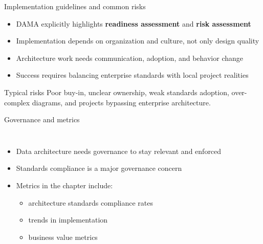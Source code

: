 \documentclass[aspectratio=169,professionalfonts]{beamer}
\newcommand{\sourcefooter}{\vspace{0.4em}{\tiny Source: DAMA-DMBOK2, Chapter 4 (Data Architecture).}}
\begin{document}
\begin{frame}{Implementation guidelines and common risks}
\begin{itemize}
    \item DAMA explicitly highlights \textbf{readiness assessment} and \textbf{risk assessment}
    \item Implementation depends on organization and culture, not only design quality
    \item Architecture work needs communication, adoption, and behavior change
    \item Success requires balancing enterprise standards with local project realities
\end{itemize}

\begin{block}{Typical risks}
Poor buy-in, unclear ownership, weak standards adoption, over-complex diagrams, and projects bypassing enterprise architecture.
\end{block}
\sourcefooter
\end{frame}

\begin{frame}{Governance and metrics}
\begin{columns}[T,totalwidth=\textwidth]
\begin{itemize}
    \item Data architecture needs governance to stay relevant and enforced
    \item Standards compliance is a major governance concern
    \item Metrics in the chapter include:
    \begin{itemize}
        \item architecture standards compliance rates
        \item trends in implementation
        \item business value metrics
    \end{itemize}
\end{itemize}
\centering
{}
\end{columns}
\sourcefooter
\end{frame}
\end{document}
